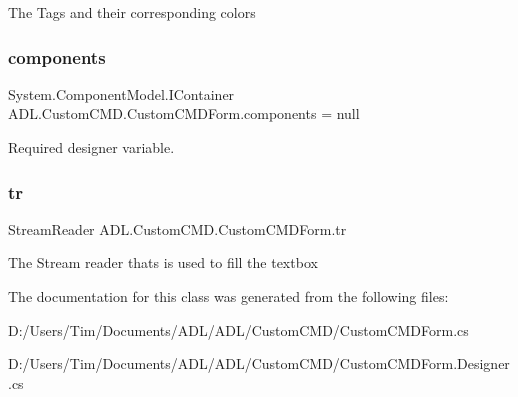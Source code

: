 The Tags and their corresponding colors 

\mbox{\label{class_a_d_l_1_1_custom_c_m_d_1_1_custom_c_m_d_form_a9e6d11d5b23133dffd23871d74bb4978}} 
\subsubsection{\texorpdfstring{components}{components}}
{\footnotesize\ttfamily System.\+Component\+Model.\+I\+Container A\+D\+L.\+Custom\+C\+M\+D.\+Custom\+C\+M\+D\+Form.\+components = null\hspace{0.3cm}{\ttfamily [private]}}



Required designer variable. 

\mbox{\label{class_a_d_l_1_1_custom_c_m_d_1_1_custom_c_m_d_form_ab41ba63fa3294b392164af4868c326c3}} 
\subsubsection{\texorpdfstring{tr}{tr}}
{\footnotesize\ttfamily Stream\+Reader A\+D\+L.\+Custom\+C\+M\+D.\+Custom\+C\+M\+D\+Form.\+tr\hspace{0.3cm}{\ttfamily [private]}}



The Stream reader thats is used to fill the textbox 



The documentation for this class was generated from the following files\+:\begin{DoxyCompactItemize}
\item 
D\+:/\+Users/\+Tim/\+Documents/\+A\+D\+L/\+A\+D\+L/\+Custom\+C\+M\+D/Custom\+C\+M\+D\+Form.\+cs\item 
D\+:/\+Users/\+Tim/\+Documents/\+A\+D\+L/\+A\+D\+L/\+Custom\+C\+M\+D/Custom\+C\+M\+D\+Form.\+Designer.\+cs\end{DoxyCompactItemize}
